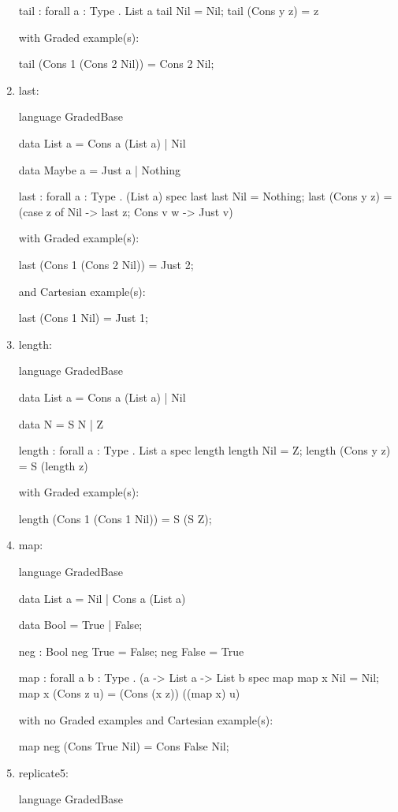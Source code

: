 \begin{enumerate}
\begin{granule}
tail : forall { a : Type } . List a %
tail Nil = Nil;
tail (Cons y z) = z
\end{granule}
with Graded example(s):
\begin{granule}
tail (Cons 1 (Cons 2 Nil)) = Cons 2 Nil;
\end{granule}
\item last: 
\begin{granule}
language GradedBase

data List a = Cons a (List a) | Nil
    
data Maybe a = Just a | Nothing    
    
last : forall { a : Type } . (List a) %
spec
    last %
last Nil = Nothing;
last (Cons y z) = 
    (case z of
        Nil -> last z;
        Cons v w -> Just v)
\end{granule}
with Graded example(s):
\begin{granule}
last (Cons 1 (Cons 2 Nil)) = Just 2;
\end{granule}
and Cartesian example(s):
\begin{granule}
last (Cons 1 Nil) = Just 1;
\end{granule}
\item length: 
\begin{granule}
language GradedBase 

data List a = Cons a (List a) | Nil 
    
data N = S N | Z
    
length : forall { a : Type } . List a %
spec
    length %
length Nil = Z;
length (Cons y z) = S (length z)
\end{granule}
with Graded example(s):
\begin{granule}
length (Cons 1 (Cons 1 Nil)) = S (S Z);
\end{granule}
\item map: 
\begin{granule}
language GradedBase

data List a = Nil | Cons a (List a) 
    
data Bool = True | False; 
    
neg : Bool %
neg True = False;
neg False = True 
    
map : forall { a b : Type } 
    . (a %
    -> List a %
    -> List b
spec 
    map %
map x Nil = Nil;
map x (Cons z u) = (Cons (x z)) ((map x) u)
\end{granule}
with no Graded examples and Cartesian example(s):
\begin{granule}
map neg (Cons True Nil) = Cons False Nil;
\end{granule}
\item replicate5: 
\begin{granule}
language GradedBase


\end{granule}
\end{enumerate}
